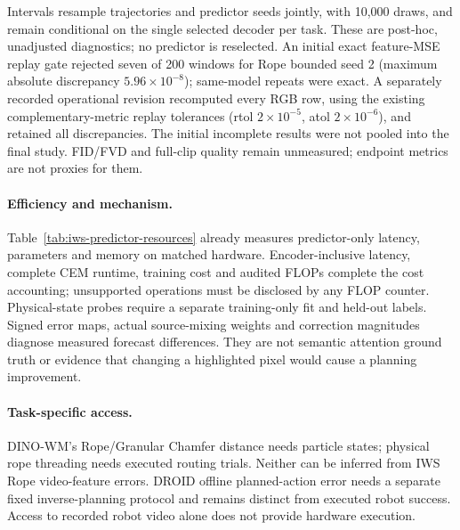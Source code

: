 Intervals resample trajectories and predictor seeds jointly, with 10,000 draws,
and remain conditional on the single selected decoder per task. These are
post-hoc, unadjusted diagnostics; no predictor is reselected. An initial exact
feature-MSE replay gate rejected seven of 200 windows for Rope bounded seed 2
(maximum absolute discrepancy $5.96\times10^{-8}$); same-model repeats were
exact. A separately recorded operational revision recomputed every RGB row,
using the existing complementary-metric replay tolerances
(rtol $2\times10^{-5}$, atol $2\times10^{-6}$), and retained all discrepancies.
The initial incomplete results were not pooled into the final study. FID/FVD
and full-clip quality remain unmeasured; endpoint metrics are not proxies for them.




\paragraph{Efficiency and mechanism.}
Table~\ref{tab:iws-predictor-resources} already measures predictor-only latency,
parameters and memory on matched hardware. Encoder-inclusive latency, complete
CEM runtime, training cost and audited FLOPs complete the cost accounting;
unsupported operations must be disclosed by any FLOP counter. Physical-state
probes require a separate training-only fit and held-out labels. Signed error
maps, actual source-mixing weights and correction magnitudes diagnose measured
forecast differences. They are not semantic attention ground truth or evidence
that changing a highlighted pixel would cause a planning improvement.

\paragraph{Task-specific access.}
DINO-WM's Rope/Granular Chamfer distance needs particle states; physical rope
threading needs executed routing trials. Neither can be inferred from IWS Rope
video-feature errors. DROID offline planned-action error needs a separate fixed
inverse-planning protocol and remains distinct from executed robot success.
Access to recorded robot video alone does not provide hardware execution.

